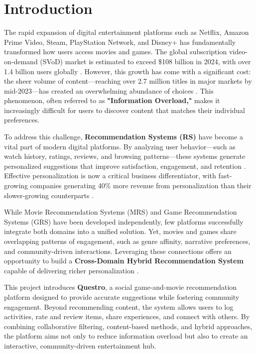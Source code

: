 \chapter{Introduction}

The rapid expansion of digital entertainment platforms such as Netflix, Amazon Prime Video, Steam, PlayStation Network, and Disney+ has fundamentally transformed how users access movies and games. The global subscription video-on-demand (SVoD) market is estimated to exceed \$108 billion in 2024, with over 1.4 billion users globally \cite{statista2023}. However, this growth has come with a significant cost: the sheer volume of content—reaching over 2.7 million titles in major markets by mid-2023—has created an overwhelming abundance of choices \cite{nielsen2023}. This phenomenon, often referred to as \textbf{"Information Overload,"} makes it increasingly difficult for users to discover content that matches their individual preferences.

To address this challenge, \textbf{Recommendation Systems (RS)} have become a vital part of modern digital platforms. By analyzing user behavior—such as watch history, ratings, reviews, and browsing patterns—these systems generate personalized suggestions that improve satisfaction, engagement, and retention \cite{ref:rs_handbook}. Effective personalization is now a critical business differentiator, with fast-growing companies generating 40\% more revenue from personalization than their slower-growing counterparts \cite{mckinsey2023}.

While Movie Recommendation Systems (MRS) and Game Recommendation Systems (GRS) have been developed independently, few platforms successfully integrate both domains into a unified solution. Yet, movies and games share overlapping patterns of engagement, such as genre affinity, narrative preferences, and community-driven interactions. Leveraging these connections offers an opportunity to build a \textbf{Cross-Domain Hybrid Recommendation System} capable of delivering richer personalization \cite{ref:cross_domain_survey}.

This project introduces \textbf{Questro}, a social game-and-movie recommendation platform designed to provide accurate suggestions while fostering community engagement. Beyond recommending content, the system allows users to log activities, rate and review items, share experiences, and connect with others. By combining collaborative filtering, content-based methods, and hybrid approaches, the platform aims not only to reduce information overload but also to create an interactive, community-driven entertainment hub.

